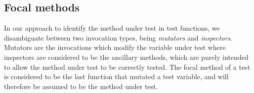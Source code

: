 \documentclass[11pt]{article}
\begin{document}
\begin{multicols}{2}
\subsection{Focal methods}
In our approach to identify the method under test in test functions, we disambiguate between two invocation types, being \textit{mutators} and \textit{inspectors}. Mutators are the invocations which modify the variable under test where inspectors are considered to be the ancillary methods, which are purely intended to allow the method under test to be correctly tested. The focal method of a test is considered to be the last function that mutated a test variable, and will therefore be assumed to be the method under test.

\end{multicols}
\end{document}
